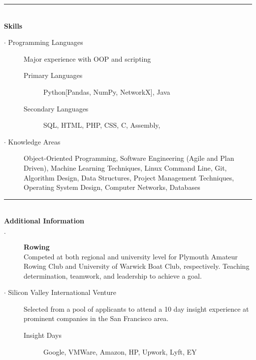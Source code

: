 \documentclass[12pt, a4paper]{article}
\begin{document}
\vspace{-2ex}
\noindent\rule{8cm}{0.4pt} \\
\textbf{Skills}
  \begin{description}
    \item[$\cdot$ Programming Languages] Major experience with OOP and scripting
    \begin{description}
      \item[Primary Languages] Python[Pandas, NumPy, NetworkX], Java
      \item[Secondary Languages] SQL, HTML, PHP, CSS, C, Assembly,
    \end{description}
    \item[$\cdot$ Knowledge Areas] Object-Oriented Programming, 
		Software Engineering (Agile and Plan Driven), 
		  Machine Learning Techniques, 
		  Linux Command Line,
      Git, 
		  Algorithm Design, 
		  Data Structures,
      Project Management Techniques, 
		  Operating System Design, 
		  Computer Networks, 
		  Databases
  \end{description}

\vspace{-2ex}
\noindent\rule{8cm}{0.4pt} \\
\textbf{Additional Information}
  \begin{description}
    \item[$\cdot$] \textbf{Rowing} \\Competed at both regional and university level for Plymouth Amateur Rowing Club and University of Warwick Boat Club, respectively. Teaching determination, teamwork, and leadership to achieve a goal.

    \iffalse
    Rowing has taught me the value of team work, and has given me transferable skills including resilience, decision making, and precision, all of which I bring to the workplace.
    Time management $\cdot$ Team work $\cdot$ Resilience $\cdot$ Motivational skills $\cdot$ Quick thinking \\ $\cdot$ Technical planning $\cdot$ Precision
    \fi

    \item[$\cdot$ Silicon Valley International Venture] Selected from a pool of applicants to attend a 10 day insight experience at prominent companies in the San Francisco area.
    \begin{description}
      \item[Insight Days] Google, VMWare, Amazon, HP, Upwork, Lyft, EY
    \end{description}
  \end{description}
\end{document}
